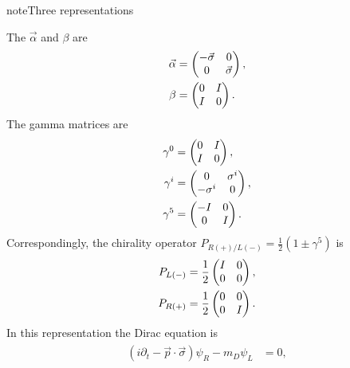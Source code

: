 \documentclass[letterpaper,12pt,english]{sphinxmanual}
\begin{document}
\begin{notice}{note}{Three representations}
\begin{itemize}
\end{itemize}

The \(\vec\alpha\) and \(\beta\) are
\begin{gather}
\begin{split}\vec \alpha &= \begin{pmatrix} -\vec \sigma & 0 \\  0 & \vec\sigma  \end{pmatrix}, \\
\beta & = \begin{pmatrix} 0 & I \\ I & 0 \end{pmatrix}.\end{split}\notag
\end{gather}
The gamma matrices are
\begin{gather}
\begin{split}\gamma^0 & = \begin{pmatrix} 0 & I \\ I & 0  \end{pmatrix}, \\
\gamma^i & = \begin{pmatrix} 0 & \sigma^i \\ -\sigma^i & 0 \end{pmatrix}, \\
\gamma^5 & = \begin{pmatrix} -I & 0 \\ 0 & I \end{pmatrix}.\end{split}\notag
\end{gather}
Correspondingly, the chirality operator \(P_{R(+)/L(-)} = \frac{1}{2}(1\pm \gamma^5)\) is
\begin{gather}
\begin{split}P_{L(-)} &=\frac{1}{2} \begin{pmatrix} I & 0 \\ 0 & 0  \end{pmatrix},\\
P_{R(+)} & = \frac{1}{2} \begin{pmatrix} 0 & 0  \\  0 & I \end{pmatrix}.\end{split}\notag
\end{gather}
In this representation the Dirac equation is
\begin{gather}
\begin{split}(i\partial_t - \vec p \cdot \vec \sigma) \psi_R - m_D\psi_L &= 0, \\

\end{split}
\end{gather}
\end{notice}
\end{document}
